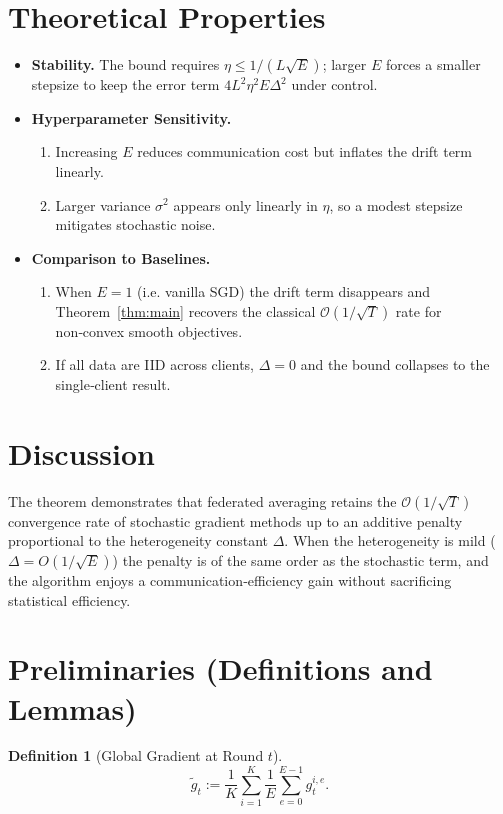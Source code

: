 \documentclass{article}
\newtheorem{definition}{Definition}
\begin{document}
\section*{Theoretical Properties}
\begin{itemize}[leftmargin=*]
\item \textbf{Stability.} The bound requires $\eta\le 1/(L\sqrt{E})$; larger $E$ forces a smaller stepsize to keep the error term $4L^2\eta^2E\Delta^2$ under control.
\item \textbf{Hyperparameter Sensitivity.}
    \begin{enumerate}
        \item Increasing $E$ reduces communication cost but inflates the drift term linearly.
        \item Larger variance $\sigma^2$ appears only linearly in $\eta$, so a modest stepsize mitigates stochastic noise.
    \end{enumerate}
\item \textbf{Comparison to Baselines.}
    \begin{enumerate}
        \item When $E=1$ (i.e. vanilla SGD) the drift term disappears and Theorem~\ref{thm:main} recovers the classical $\mathcal{O}(1/\sqrt{T})$ rate for non‑convex smooth objectives.
        \item If all data are IID across clients, $\Delta=0$ and the bound collapses to the single‑client result.
    \end{enumerate}
\end{itemize}

\section*{Discussion}
The theorem demonstrates that federated averaging retains the $\mathcal{O}(1/\sqrt{T})$ convergence rate of stochastic gradient methods up to an additive penalty proportional to the heterogeneity constant $\Delta$. When the heterogeneity is mild ($\Delta=O(1/\sqrt{E})$) the penalty is of the same order as the stochastic term, and the algorithm enjoys a communication‑efficiency gain without sacrificing statistical efficiency.

\newpage
\section*{Preliminaries (Definitions and Lemmas)}
\begin{definition}[Global Gradient at Round $t$]
\[
\tilde g_t := \frac1K\sum_{i=1}^K \frac1E\sum_{e=0}^{E-1} g_{t}^{i,e}.
\]
\end{definition}
\end{document}
